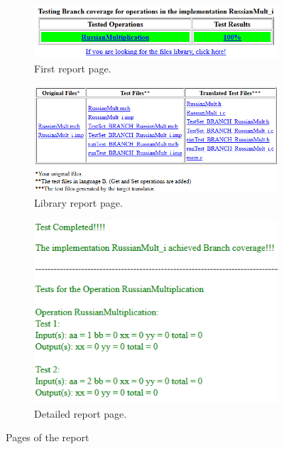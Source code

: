 \documentclass[runningheads]{llncs}
\begin{document}
\begin{figure}[ht]
\begin{minipage}{0.45\textwidth}
\begin{subfigure}{\textwidth}
\centering
\includegraphics[width = \textwidth]{imagens/reporte1.png}
\caption{First report page.}
\label{fig:report1}
\end{subfigure}
\begin{subfigure}{\textwidth}
\centering
\includegraphics[width = \textwidth]{imagens/reporte3.png}
\caption{Library report page.}
\label{fig:report3}
\end{subfigure}
\end{minipage}
\begin{subfigure}{0.50\textwidth}
\centering
\includegraphics[width = \textwidth]{imagens/reporte2.png}
\caption{Detailed report page.}
\label{fig:report2}
\end{subfigure}
\caption{Pages of the report}
\end{figure}
\end{document}
